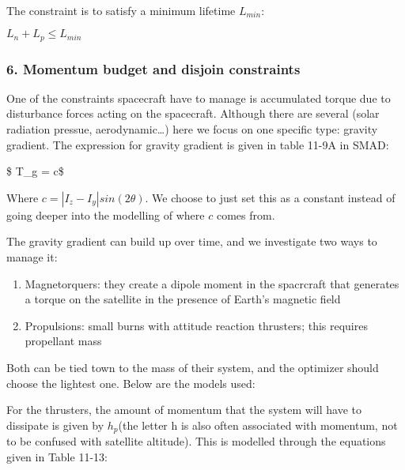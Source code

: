 \documentclass[11pt]{article}
\providecommand{\tightlist}{%
      \setlength{\itemsep}{0pt}\setlength{\parskip}{0pt}}
\begin{document}
    \begin{center}
    \end{center}
    { \hspace*{\fill} \\}
    
    The constraint is to satisfy a minimum lifetime \(L_{min}\):

\(L_n + L_p \leq L_{min}\)

    \hypertarget{momentum-budget-and-disjoin-constraints}{%
\subsubsection{6. Momentum budget and disjoin
constraints}\label{momentum-budget-and-disjoin-constraints}}

    One of the constraints spacecraft have to manage is accumulated torque
due to disturbance forces acting on the spacecraft. Although there are
several (solar radiation pressue, aerodynamic\ldots{}) here we focus on
one specific type: gravity gradient. The expression for gravity gradient
is given in table 11-9A in SMAD:

\$ T\_g = c\$

Where \(c = |I_z-I_y|sin(2\theta)\). We choose to just set this as a
constant instead of going deeper into the modelling of where \(c\) comes
from.

The gravity gradient can build up over time, and we investigate two ways
to manage it:

\begin{enumerate}
\def\labelenumi{\arabic{enumi}.}
\tightlist
\item
  Magnetorquers: they create a dipole moment in the spacrcraft that
  generates a torque on the satellite in the presence of Earth's
  magnetic field
\item
  Propulsions: small burns with attitude reaction thrusters; this
  requires propellant mass
\end{enumerate}

Both can be tied town to the mass of their system, and the optimizer
should choose the lightest one. Below are the models used:

For the thrusters, the amount of momentum that the system will have to
dissipate is given by \(h_p\)(the letter h is also often associated with
momentum, not to be confused with satellite altitude). This is modelled
through the equations given in Table 11-13:
\end{document}
